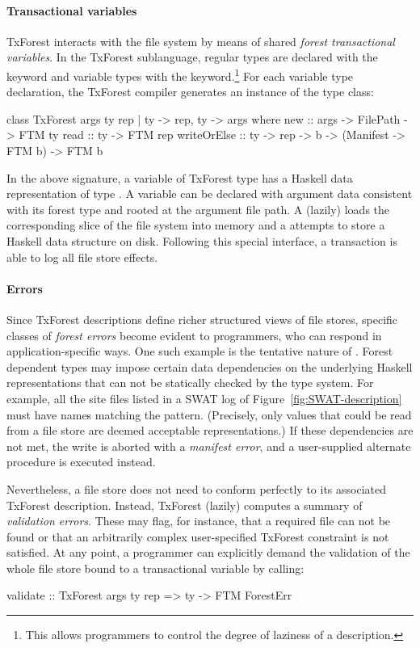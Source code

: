 \paragraph{Transactional variables}
TxForest interacts with the file system by means of shared \emph{forest transactional variables}. In the TxForest sublanguage, regular types are declared with the  keyword and variable types with the  keyword.\footnote{This allows programmers to control the degree of laziness of a description.} For each variable type declaration, the TxForest compiler generates an instance of the  type class:
\begin{code}
class TxForest args ty rep | ty -> rep, ty -> args where
  new         :: args -> FilePath -> FTM ty
  read        :: ty -> FTM rep
  writeOrElse :: ty -> rep -> b
              -> (Manifest -> FTM b) -> FTM b
\end{code}
In the above signature, a variable of TxForest type  has a Haskell data representation of type . A  variable can be declared with argument data consistent with its forest type and rooted at the argument file path. A  (lazily) loads the corresponding slice of the file system into memory and a  attempts to store a Haskell data structure on disk.
Following this special interface, a transaction is able to log all file store effects.

\paragraph{Errors}
Since TxForest descriptions define richer structured views of file stores, specific classes of \emph{forest errors} become evident to programmers, who can respond in application-specific ways.
One such example is the tentative nature of . Forest dependent types may impose certain data dependencies on the underlying Haskell representations that can not be statically checked by the type system. For example, all the site files listed in a SWAT log of Figure~\ref{fig:SWAT-description} must have names matching the  pattern. (Precisely, only values that could be read from a file store are deemed acceptable representations.) If these dependencies are not met, the write is aborted with a \emph{manifest error}, and a user-supplied alternate procedure is executed instead.

Nevertheless, a file store does not need to conform perfectly to its associated TxForest description.
Instead, TxForest (lazily) computes a summary of \emph{validation errors}. These may flag, for instance, that a required file can not be found or that an arbitrarily complex user-specified TxForest constraint is not satisfied.
At any point, a programmer can explicitly demand the validation of the whole file store bound to a transactional variable by calling:
\begin{code}
validate :: TxForest args ty rep => ty -> FTM ForestErr
\end{code}

